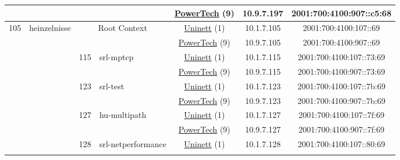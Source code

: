 \begin{small}
\begin{center}
\begin{longtable}{|c|c|c|c|c|c|c|c|}
  &  &  &  & \multicolumn{2}{|c|}{\tiny{\href{http://www.powertech.no}{PowerTech} (9)}} & \tiny{10.9.7.197} & \tiny{2001:700:4100:907::c5:68} \\ \hline
 \multirow{30}{*}{\tiny{105}} & \multicolumn{1}{|l|}{\multirow{30}{*}{\tiny{heinzelnisse}}} & \multicolumn{2}{|c|}{\multirow{2}{*}{\tiny{Root Context}}} & \multicolumn{2}{|c|}{\tiny{\href{https://www.uninett.no}{Uninett} (1)}} & \tiny{10.1.7.105} & \tiny{2001:700:4100:107::69} \\* \cline{5-5}\cline{6-6}\cline{7-7}\cline{8-8}
  &  & \multicolumn{2}{|c|}{} & \multicolumn{2}{|c|}{\tiny{\href{http://www.powertech.no}{PowerTech} (9)}} & \tiny{10.9.7.105} & \tiny{2001:700:4100:907::69} \\* \cline{3-3}\cline{4-4}\cline{5-5}\cline{6-6}\cline{7-7}\cline{8-8}
  &  & \multirow{2}{*}{\tiny{115}} & \multicolumn{1}{|l|}{\multirow{2}{*}{\tiny{srl-mptcp}}} & \multicolumn{2}{|c|}{\tiny{\href{https://www.uninett.no}{Uninett} (1)}} & \tiny{10.1.7.115} & \tiny{2001:700:4100:107::73:69} \\* \cline{5-5}\cline{6-6}\cline{7-7}\cline{8-8}
  &  &  &  & \multicolumn{2}{|c|}{\tiny{\href{http://www.powertech.no}{PowerTech} (9)}} & \tiny{10.9.7.115} & \tiny{2001:700:4100:907::73:69} \\* \cline{3-3}\cline{4-4}\cline{5-5}\cline{6-6}\cline{7-7}\cline{8-8}
  &  & \multirow{2}{*}{\tiny{123}} & \multicolumn{1}{|l|}{\multirow{2}{*}{\tiny{srl-test}}} & \multicolumn{2}{|c|}{\tiny{\href{https://www.uninett.no}{Uninett} (1)}} & \tiny{10.1.7.123} & \tiny{2001:700:4100:107::7b:69} \\* \cline{5-5}\cline{6-6}\cline{7-7}\cline{8-8}
  &  &  &  & \multicolumn{2}{|c|}{\tiny{\href{http://www.powertech.no}{PowerTech} (9)}} & \tiny{10.9.7.123} & \tiny{2001:700:4100:907::7b:69} \\* \cline{3-3}\cline{4-4}\cline{5-5}\cline{6-6}\cline{7-7}\cline{8-8}
  &  & \multirow{2}{*}{\tiny{127}} & \multicolumn{1}{|l|}{\multirow{2}{*}{\tiny{hu-multipath}}} & \multicolumn{2}{|c|}{\tiny{\href{https://www.uninett.no}{Uninett} (1)}} & \tiny{10.1.7.127} & \tiny{2001:700:4100:107::7f:69} \\* \cline{5-5}\cline{6-6}\cline{7-7}\cline{8-8}
  &  &  &  & \multicolumn{2}{|c|}{\tiny{\href{http://www.powertech.no}{PowerTech} (9)}} & \tiny{10.9.7.127} & \tiny{2001:700:4100:907::7f:69} \\* \cline{3-3}\cline{4-4}\cline{5-5}\cline{6-6}\cline{7-7}\cline{8-8}
  &  & \multirow{2}{*}{\tiny{128}} & \multicolumn{1}{|l|}{\multirow{2}{*}{\tiny{srl-netperformance}}} & \multicolumn{2}{|c|}{\tiny{\href{https://www.uninett.no}{Uninett} (1)}} & \tiny{10.1.7.128} & \tiny{2001:700:4100:107::80:69} \\* \cline{5-5}\cline{6-6}\cline{7-7}\cline{8-8}

\end{longtable}
\end{center}
\end{small}

